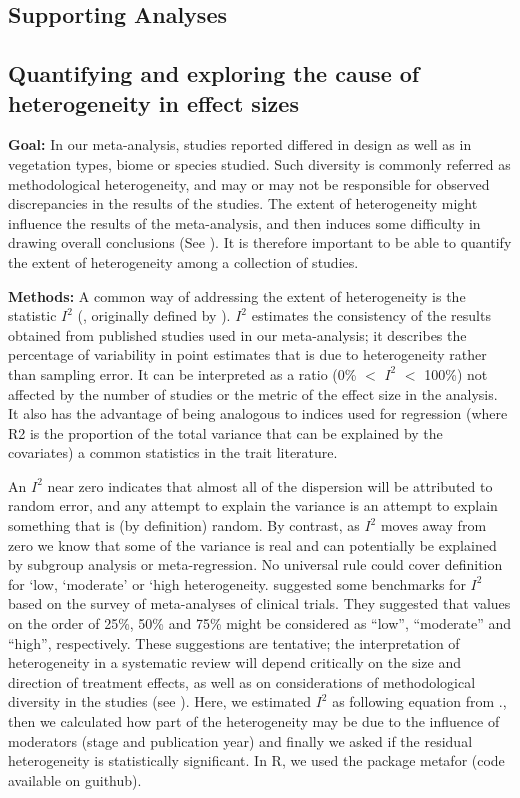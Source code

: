 \documentclass[a4paper]{article}\usepackage[]{graphicx}\usepackage[]{color}
\begin{document}
\begin{appendices}
\clearpage
\section{Supporting Analyses}\label{app:supp_info_analyses}
\subsection{Quantifying and exploring the cause of heterogeneity in effect sizes}

\textbf{Goal:} In our meta-analysis, studies reported differed in design as well as in vegetation types, biome or species studied. Such diversity is commonly referred as methodological heterogeneity, and may or may not be responsible for observed discrepancies in the results of the studies. The extent of heterogeneity might influence the results of the meta-analysis, and then induces some difficulty in drawing overall conclusions (See \citealt{Higgins:2002iq}). It is therefore important to be able to quantify the extent of heterogeneity among a collection of studies.

\textbf{Methods:} A common way of addressing the extent of heterogeneity is the statistic $I^{2}$ (\citealt{Santos:2012gt}, originally defined by \citealt{Higgins:2002iq}). $I^{2}$ estimates the consistency of the results obtained from published studies used in our meta-analysis; it describes the percentage of variability in point estimates that is due to heterogeneity rather than sampling error. It can be interpreted as a ratio (0\% $<$ $I^{2}$ $<$ 100\%) not affected by the number of studies or the metric of the effect size in the analysis. It also has the advantage of being analogous to indices used for regression (where R2 is the proportion of the total variance that can be explained by the covariates) a common statistics in the trait literature.

An $I^{2}$ near zero indicates that almost all of the dispersion will be attributed to random error, and any attempt to explain the variance is an attempt to explain something that is (by definition) random. By contrast, as $I^{2}$ moves away from zero we know that some of the variance is real and can potentially be explained by subgroup analysis or meta-regression.
No universal rule could cover definition for ‘low, ‘moderate’ or ‘high heterogeneity. \citealt{Higgins:2003hz} suggested some benchmarks for $I^{2}$ based on the survey of meta-analyses of clinical trials. They suggested that values on the order of 25\%, 50\% and 75\% might be considered as ``low'', ``moderate'' and ``high'', respectively. These suggestions are tentative; the interpretation of heterogeneity in a systematic review will depend critically on the size and direction of treatment effects, as well as on considerations of methodological diversity in the studies (see \citealt{Borenstein:2009um}).
Here, we estimated $I^{2}$ as following equation from \citealt{Higgins:2002iq}., then we calculated how part of the heterogeneity may be due to the influence of moderators (stage and publication year) and finally we asked if the residual heterogeneity is statistically significant. In R, we used the package metafor (code available on guithub).



\end{appendices}
\end{document}
